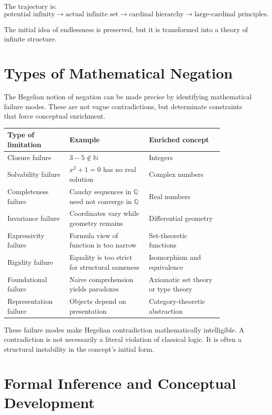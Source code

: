 \documentclass[11pt]{article}
\begin{document}
The trajectory is:
\[
\text{potential infinity}
\longrightarrow
\text{actual infinite set}
\longrightarrow
\text{cardinal hierarchy}
\longrightarrow
\text{large-cardinal principles}.
\]

The initial idea of endlessness is preserved, but it is transformed into a theory of infinite structure.

\section{Types of Mathematical Negation}

The Hegelian notion of negation can be made precise by identifying mathematical failure modes. These are not vague contradictions, but determinate constraints that force conceptual enrichment.

\begin{center}
\begin{tabular}{p{0.25\linewidth}p{0.32\linewidth}p{0.30\linewidth}}
\toprule
Type of limitation & Example & Enriched concept \\
\midrule
Closure failure & $3-5\notin\mathbb{N}$ & Integers \\
Solvability failure & $x^2+1=0$ has no real solution & Complex numbers \\
Completeness failure & Cauchy sequences in $\mathbb{Q}$ need not converge in $\mathbb{Q}$ & Real numbers \\
Invariance failure & Coordinates vary while geometry remains & Differential geometry \\
Expressivity failure & Formula view of function is too narrow & Set-theoretic functions \\
Rigidity failure & Equality is too strict for structural sameness & Isomorphism and equivalence \\
Foundational failure & Naive comprehension yields paradoxes & Axiomatic set theory or type theory \\
Representation failure & Objects depend on presentation & Category-theoretic abstraction \\
\bottomrule
\end{tabular}
\end{center}

These failure modes make Hegelian contradiction mathematically intelligible. A contradiction is not necessarily a literal violation of classical logic. It is often a structural instability in the concept's initial form.

\section{Formal Inference and Conceptual Development}
\end{document}

